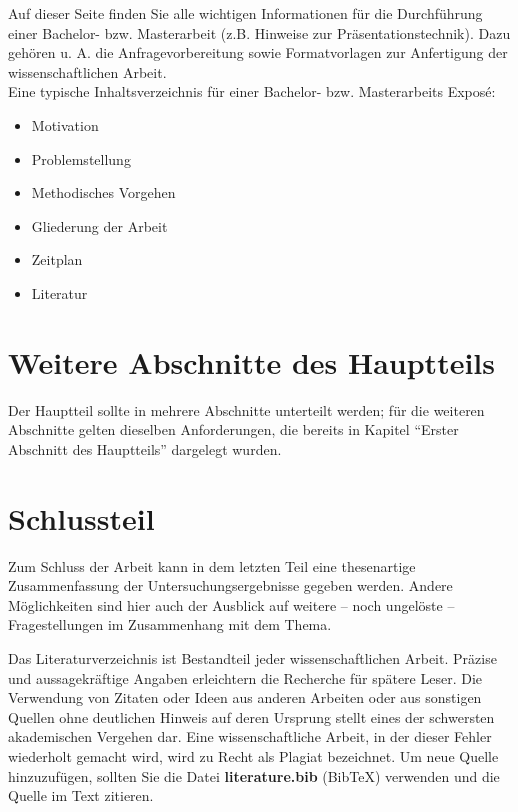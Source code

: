 \documentclass[11pt]{scrartcl}
\newcommand{\href}[2]{#2}
\begin{document}
Auf dieser \href{https://www.uni-oldenburg.de/informatik/vlba/lehre/hinweise-und-vorlagen/}{Seite} finden Sie alle wichtigen Informationen für die Durchführung einer Bachelor- bzw. Masterarbeit (z.B. \href{https://www.uni-oldenburg.de/fileadmin/user_upload/informatik/ag/vlba/download/Praesentationstechnik.pdf}{Hinweise zur Präsentationstechnik}). Dazu gehören u. A. die Anfragevorbereitung sowie Formatvorlagen zur Anfertigung der wissenschaftlichen Arbeit.\\


Eine typische Inhaltsverzeichnis für einer Bachelor- bzw. Masterarbeits Exposé:

\begin{itemize}
	\item Motivation
	\item Problemstellung
	\item Methodisches Vorgehen
	\item Gliederung der Arbeit
	\item Zeitplan
	\item Literatur
\end{itemize}

\section{Weitere Abschnitte des Hauptteils}

Der Hauptteil sollte in mehrere Abschnitte unterteilt werden; für die weiteren Abschnitte gelten dieselben Anforderungen, die bereits in Kapitel "`Erster Abschnitt des Hauptteils"' dargelegt wurden.

\section{Schlussteil}

Zum Schluss der Arbeit kann in dem letzten Teil eine thesenartige Zusammenfassung der Untersuchungsergebnisse gegeben werden. Andere Möglichkeiten sind hier auch der Ausblick auf weitere – noch ungelöste – Fragestellungen im Zusammenhang mit dem Thema.

\newpage


Das Literaturverzeichnis ist Bestandteil jeder wissenschaftlichen Arbeit. Präzise und aussagekräftige Angaben erleichtern die Recherche für spätere Leser. Die Verwendung von Zitaten oder Ideen aus anderen Arbeiten oder aus sonstigen Quellen ohne deutlichen Hinweis auf deren Ursprung stellt eines der schwersten akademischen Vergehen dar. Eine wissenschaftliche Arbeit, in der dieser Fehler wiederholt gemacht wird, wird zu Recht als Plagiat bezeichnet. Um neue Quelle hinzuzufügen, sollten Sie die Datei \textbf{literature.bib} (BibTeX) verwenden und die Quelle im Text zitieren.
\end{document}
